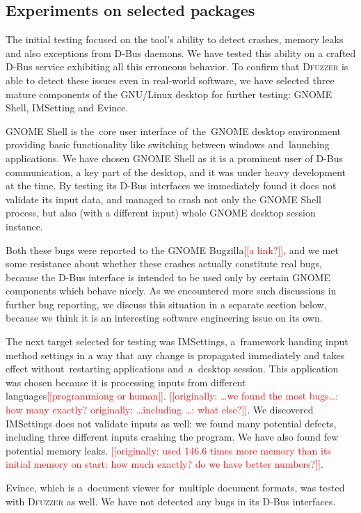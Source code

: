\documentclass[conference]{IEEEtran}
\newcommand{\addtodo}[1]{\textcolor{red}{[[#1]]}}
\begin{document}
\subsection{Experiments on selected packages}
The initial testing focused on the tool's ability to detect crashes, memory
leaks and also exceptions from D-Bus daemons. We have tested this ability
on a crafted D-Bus service exhibiting all this erroneous behavior.
To confirm that \textsc{Dfuzzer} is able to detect these issues even in
real-world software, we have selected three mature components of the GNU/Linux
desktop for further testing: GNOME Shell, IMSetting and Evince. 

GNOME Shell is the~core user interface of~the~GNOME desktop environment
providing basic functionality like switching between windows and~launching
applications. We have chosen GNOME Shell as it is a prominent user of D-Bus
communication, a key part of the desktop, and it was under heavy development
at the time.
By testing its D-Bus interfaces we immediately found it does not validate its
input data, and managed to crash not only the GNOME Shell process, but also
(with a different input) whole GNOME desktop session instance.

Both these bugs were reported to the GNOME Bugzilla\addtodo{a link?}, and we met
some resistance about whether these crashes actually constitute real bugs, because
the D-Bus interface is intended to be used only by certain GNOME components which behave
nicely. As we encountered more such discussions in further bug reporting, we
discuss this situation in a separate section below, because we think it is an
interesting software engineering issue on its own.

The next target selected for testing was IMSettings, a~framework handing input
method settings in a way that any change is propagated immediately and takes
effect without~restarting applications and~a~desktop session. This application
was chosen because it is processing inputs from different
languages\addtodo{programmiong or human}.
\addtodo{originally: \ldots we found the most bugs\ldots: how many exactly?
originally: \ldots including \ldots: what else?}. We discovered IMSettings does
not validate inputs as well: we found many potential defects, including three
different inputs crashing the program. We have also found few potential memory
leaks. \addtodo{originally: used 146.6 times more memory than its initial memory
on start: how much exactly? do we have better numbers?}.

Evince, which is a~document viewer for~multiple document formats, was tested
with \textsc{Dfuzzer} as well. We have not detected any bugs in its D-Bus interfaces.
\end{document}
